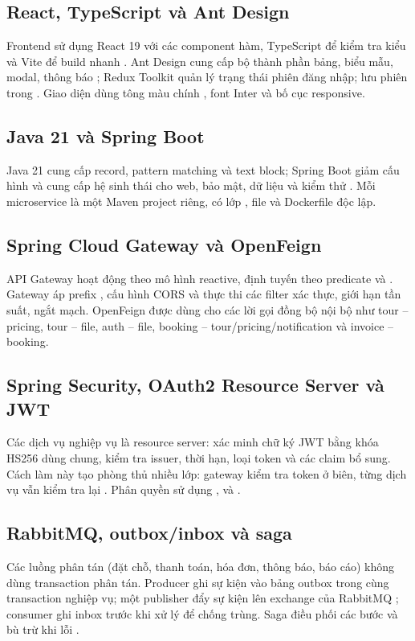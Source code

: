 \subsection{React, TypeScript và Ant Design}
Frontend sử dụng React 19 với các component hàm, TypeScript để kiểm tra kiểu và Vite để build nhanh \cite{react,vite}. Ant Design cung cấp bộ thành phần bảng, biểu mẫu, modal, thông báo \cite{antd}; Redux Toolkit quản lý trạng thái phiên đăng nhập;  lưu phiên trong . Giao diện dùng tông màu chính , font Inter và bố cục responsive.

\subsection{Java 21 và Spring Boot}
Java 21 cung cấp record, pattern matching và text block; Spring Boot giảm cấu hình và cung cấp hệ sinh thái cho web, bảo mật, dữ liệu và kiểm thử \cite{springboot}. Mỗi microservice là một Maven project riêng, có lớp , file  và Dockerfile độc lập.

\subsection{Spring Cloud Gateway và OpenFeign}
API Gateway hoạt động theo mô hình reactive, định tuyến theo predicate và . Gateway áp prefix , cấu hình CORS và thực thi các filter xác thực, giới hạn tần suất, ngắt mạch. OpenFeign được dùng cho các lời gọi đồng bộ nội bộ như tour -- pricing, tour -- file, auth -- file, booking -- tour/pricing/notification và invoice -- booking.

\subsection{Spring Security, OAuth2 Resource Server và JWT}
Các dịch vụ nghiệp vụ là resource server: xác minh chữ ký JWT bằng khóa HS256 dùng chung, kiểm tra issuer, thời hạn, loại token và các claim bổ sung. Cách làm này tạo phòng thủ nhiều lớp: gateway kiểm tra token ở biên, từng dịch vụ vẫn kiểm tra lại \cite{springsecurity,jwt}. Phân quyền sử dụng ,  và .

\subsection{RabbitMQ, outbox/inbox và saga}
Các luồng phân tán (đặt chỗ, thanh toán, hóa đơn, thông báo, báo cáo) không dùng transaction phân tán. Producer ghi sự kiện vào bảng outbox trong cùng transaction nghiệp vụ; một publisher đẩy sự kiện lên exchange  của RabbitMQ \cite{rabbitmq}; consumer ghi inbox trước khi xử lý để chống trùng. Saga điều phối các bước và bù trừ khi lỗi \cite{saga}.

